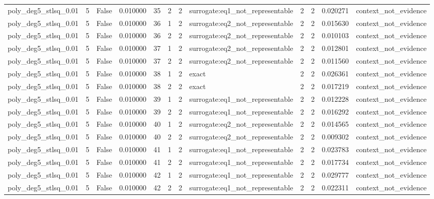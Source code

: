 \begin{tabular}{lrrrrrrlrrrl}
poly\_deg5\_stlsq\_0.01 & 5 & False & 0.010000 & 35 & 2 & 2 & surrogate:eq1\_not\_representable & 2 & 2 & 0.020271 & context\_not\_evidence \\
poly\_deg5\_stlsq\_0.01 & 5 & False & 0.010000 & 36 & 1 & 2 & surrogate:eq2\_not\_representable & 2 & 2 & 0.015630 & context\_not\_evidence \\
poly\_deg5\_stlsq\_0.01 & 5 & False & 0.010000 & 36 & 2 & 2 & surrogate:eq2\_not\_representable & 2 & 2 & 0.010103 & context\_not\_evidence \\
poly\_deg5\_stlsq\_0.01 & 5 & False & 0.010000 & 37 & 1 & 2 & surrogate:eq2\_not\_representable & 2 & 2 & 0.012801 & context\_not\_evidence \\
poly\_deg5\_stlsq\_0.01 & 5 & False & 0.010000 & 37 & 2 & 2 & surrogate:eq2\_not\_representable & 2 & 2 & 0.011560 & context\_not\_evidence \\
poly\_deg5\_stlsq\_0.01 & 5 & False & 0.010000 & 38 & 1 & 2 & exact & 2 & 2 & 0.026361 & context\_not\_evidence \\
poly\_deg5\_stlsq\_0.01 & 5 & False & 0.010000 & 38 & 2 & 2 & exact & 2 & 2 & 0.017219 & context\_not\_evidence \\
poly\_deg5\_stlsq\_0.01 & 5 & False & 0.010000 & 39 & 1 & 2 & surrogate:eq1\_not\_representable & 2 & 2 & 0.012228 & context\_not\_evidence \\
poly\_deg5\_stlsq\_0.01 & 5 & False & 0.010000 & 39 & 2 & 2 & surrogate:eq1\_not\_representable & 2 & 2 & 0.016292 & context\_not\_evidence \\
poly\_deg5\_stlsq\_0.01 & 5 & False & 0.010000 & 40 & 1 & 2 & surrogate:eq2\_not\_representable & 2 & 2 & 0.014565 & context\_not\_evidence \\
poly\_deg5\_stlsq\_0.01 & 5 & False & 0.010000 & 40 & 2 & 2 & surrogate:eq2\_not\_representable & 2 & 2 & 0.009302 & context\_not\_evidence \\
poly\_deg5\_stlsq\_0.01 & 5 & False & 0.010000 & 41 & 1 & 2 & surrogate:eq1\_not\_representable & 2 & 2 & 0.023783 & context\_not\_evidence \\
poly\_deg5\_stlsq\_0.01 & 5 & False & 0.010000 & 41 & 2 & 2 & surrogate:eq1\_not\_representable & 2 & 2 & 0.017734 & context\_not\_evidence \\
poly\_deg5\_stlsq\_0.01 & 5 & False & 0.010000 & 42 & 1 & 2 & surrogate:eq1\_not\_representable & 2 & 2 & 0.029777 & context\_not\_evidence \\
poly\_deg5\_stlsq\_0.01 & 5 & False & 0.010000 & 42 & 2 & 2 & surrogate:eq1\_not\_representable & 2 & 2 & 0.022311 & context\_not\_evidence \\

\end{tabular}
